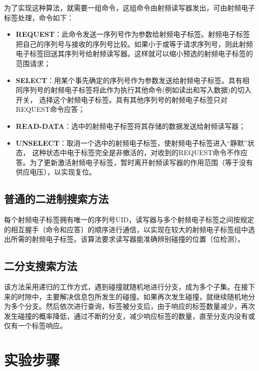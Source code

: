\documentclass[a4paper]{ctexart}
\begin{document}
为了实现这种算法，就需要一组命令，这组命令由射频读写器发出，可由射频电子标签处理，命令如下：
\begin{itemize}
	\item {\bfseries REQUEST}：此命令发送一序列号作为参数给射频电子标签。射频电子标签把自己的序列号与接收的序列号比较。如果小于或等于请求序列号，则此射频电子标签回送其序列号给射频读写器。这样就可以缩小预选的射频电子标签的范围请求；
	\item {\bfseries SELECT}：用某个事先确定的序列号作为参数发送给射频电子标签。具有相同序列号的射频电子标签将此作为执行其他命令(例如读出和写入数据)的切入开关， 选择这个射频电子标签。具有其他序列号的射频电子标签只对REQUEST命令应答；
	\item {\bfseries READ-DATA}：选中的射频电子标签将其存储的数据发送给射频读写器；
	\item {\bfseries UNSELECT}：取消一个选中的射频电子标签，使射频电子标签进入“静默”状态， 这种状态中电于标签完全是非撤活的，对收到的REQUEST命令不作应答。为了更新激活射频电子标签，暂时离开射频读写器的作用范围（等于没有供应电压），以实现复位。
\end{itemize}\subsection{普通的二进制搜索方法}\label{普通的二进制搜索方法}
每个射频电子标签拥有唯一的序列号UID，读写器与多个射频电子标签之间按规定的相互握手（命令和应答）的顺序进行通信，以实现在较大的射频电子标签组中选出所需的射频电子标签。该算法要求读写器能准确辨别碰撞的位置（位检测）。

\subsection{二分支搜索方法}\label{二分支搜索方法}
该方法采用递归的工作方式，遇到碰撞就随机地进行分支，成为多个子集。在接下来的时隙中，主要解决信息包所发生的碰撞。如果再次发生碰撞，就继续随机地分为多个分支。然后依次进行查询，标签被分支后，由于响应的标签数量减少，再次发生碰撞的概率降低，通过不断的分支，减少响应标签的数量，直至分支内没有或仅有一个标签响应。

\section{实验步骤}
\end{document}
